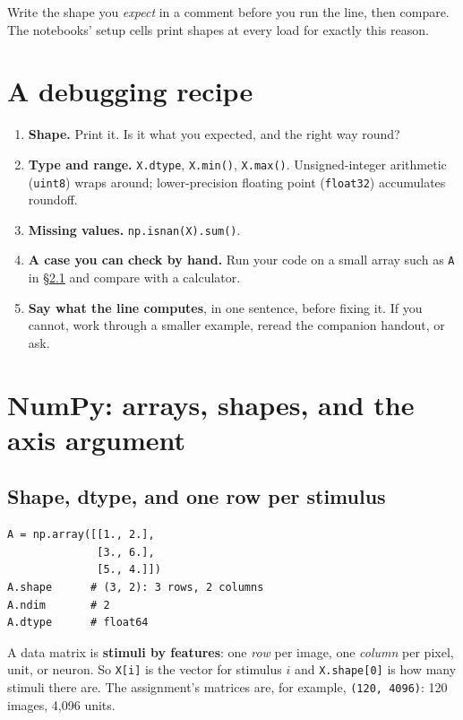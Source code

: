 \documentclass[11pt]{article}
\begin{document}
Write the shape you \emph{expect} in a comment before you run the line, then compare. The
notebooks' setup cells print shapes at every load for exactly this reason.

\section{A debugging recipe}\label{sec:debug}

\begin{enumerate}
\item \textbf{Shape.} Print it. Is it what you expected, and the right way round?
\item \textbf{Type and range.} \texttt{X.dtype}, \texttt{X.min()}, \texttt{X.max()}.
      Unsigned-integer arithmetic (\texttt{uint8}) wraps around; lower-precision
      floating point (\texttt{float32}) accumulates roundoff.
\item \textbf{Missing values.} \texttt{np.isnan(X).sum()}.
\item \textbf{A case you can check by hand.} Run your code on a small array such as
      \texttt{A} in \S\ref{sec:shape} and compare with a calculator.
\item \textbf{Say what the line computes}, in one sentence, before fixing it. If you
      cannot, work through a smaller example, reread the companion handout, or ask.
\end{enumerate}

\section{NumPy: arrays, shapes, and the axis argument}\label{sec:numpy}

\subsection{Shape, dtype, and one row per stimulus}\label{sec:shape}

\begin{codebox}
\begin{verbatim}
A = np.array([[1., 2.],
              [3., 6.],
              [5., 4.]])
A.shape      # (3, 2): 3 rows, 2 columns
A.ndim       # 2
A.dtype      # float64
\end{verbatim}
\end{codebox}

\begin{keybox}
 A data matrix is \textbf{stimuli by features}: one \emph{row} per
image, one \emph{column} per pixel, unit, or neuron. So \texttt{X[i]} is the vector for
stimulus $i$ and \texttt{X.shape[0]} is how many stimuli there are. The assignment's
matrices are, for example, \texttt{(120, 4096)}: 120 images, 4{,}096 units.
\end{keybox}
\end{document}
